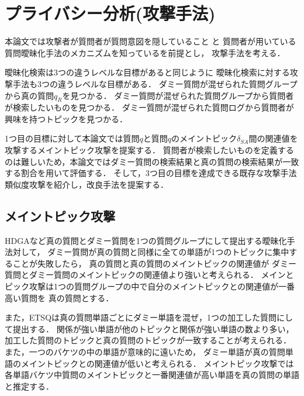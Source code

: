 \documentclass[master]{suribt}
\theoremstyle{definition}
\newcommand{\argmax}{\mathop{\rm argmax}\limits}
\begin{document}
 \chapter{プライバシー分析(攻撃手法)}
 本論文では攻撃者が質問者が質問意図を隠していること
 と
 質問者が用いている質問曖昧化手法のメカニズムを知っているを前提とし，
 攻撃手法を考える．

 曖昧化検索は3つの違うレベルな目標があると同じように
 曖昧化検索に対する攻撃手法も3つの違うレベルな目標がある．
 ダミー質問が混ぜられた質問グループから真の質問$q_R$を見つかる．
 ダミー質問が混ぜられた質問グループから質問者が検索したいものを見つかる．
 ダミー質問が混ぜられた質問ログから質問者が興味を持つトピックを見つかる．

 1つ目の目標に対して本論文では質問$q$と質問$q$のメイントピック$\delta_{SA}$間の関連値を攻撃するメイントピック攻撃を提案する．
 質問者が検索したいものを定義するのは難しいため，本論文ではダミー質問の検索結果と真の質問の検索結果が一致する割合を用いて評価する．
 そして，3つ目の目標を達成できる既存な攻撃手法類似度攻撃\cite{simattack2016}を紹介し，改良手法を提案する．

 \section{メイントピック攻撃}
 HDGAなど真の質問とダミー質問を1つの質問グループにして提出する曖昧化手法対して，
 ダミー質問が真の質問と同様に全ての単語が1つのトピックに集中することが失敗したら，
 真の質問と真の質問のメイントピックの関連値が
 ダミー質問とダミー質問のメイントピックの関連値より強いと考えられる．
 メインとピック攻撃は1つの質問グループの中で自分のメイントピックとの関連値が一番高い質問を
 真の質問とする．

 また，ETSQは真の質問単語ごとにダミー単語を混ぜ，1つの加工した質問にして提出する．
 関係が強い単語が他のトピックと関係が強い単語の数より多い，
 加工した質問のトピックと真の質問のトピックが一致することが考えられる．
 また，一つのバケツの中の単語が意味的に遠いため，
 ダミー単語が真の質問単語のメイントピックとの関連値が低いと考えられる．
 メイントピック攻撃では各単語バケツ中質問のメイントピックと一番関連値が高い単語を真の質問の単語と推定する．

\end{document}
